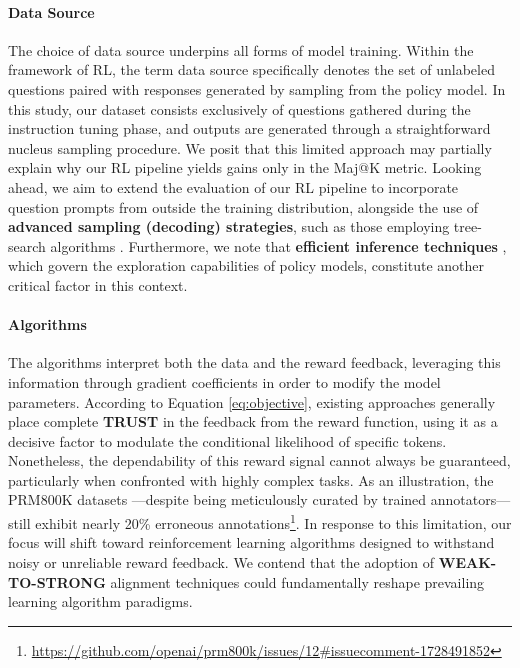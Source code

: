 \begin{itemize}[topsep=0pt]
\begin{itemize}[topsep=0pt]
\paragraph{Data Source} The choice of data source underpins all forms of model training. Within the framework of RL, the term data source specifically denotes the set of unlabeled questions paired with responses generated by sampling from the policy model. In this study, our dataset consists exclusively of questions gathered during the instruction tuning phase, and outputs are generated through a straightforward nucleus sampling procedure. We posit that this limited approach may partially explain why our RL pipeline yields gains only in the Maj@K metric. Looking ahead, we aim to extend the evaluation of our RL pipeline to incorporate question prompts from outside the training distribution, alongside the use of \textbf{advanced sampling (decoding) strategies}, such as those employing tree-search algorithms \citep{yao2023tree}. Furthermore, we note that \textbf{efficient inference techniques} \citep{xia-etal-2023-speculative,leviathan2023fast,kwon2023efficient,xia2024unlocking}, which govern the exploration capabilities of policy models, constitute another critical factor in this context.

\paragraph{Algorithms} The algorithms interpret both the data and the reward feedback, leveraging this information through gradient coefficients in order to modify the model parameters. According to Equation \ref{eq:objective}, existing approaches generally place complete \textbf{TRUST} in the feedback from the reward function, using it as a decisive factor to modulate the conditional likelihood of specific tokens. Nonetheless, the dependability of this reward signal cannot always be guaranteed, particularly when confronted with highly complex tasks. As an illustration, the PRM800K datasets \citep{lightman2023let}—despite being meticulously curated by trained annotators—still exhibit nearly 20\% erroneous annotations\footnote{\url{https://github.com/openai/prm800k/issues/12\#issuecomment-1728491852}}. In response to this limitation, our focus will shift toward reinforcement learning algorithms designed to withstand noisy or unreliable reward feedback. We contend that the adoption of \textbf{WEAK-TO-STRONG} alignment techniques \citep{burns2023weak} could fundamentally reshape prevailing learning algorithm paradigms.


\end{itemize}
\end{itemize}
